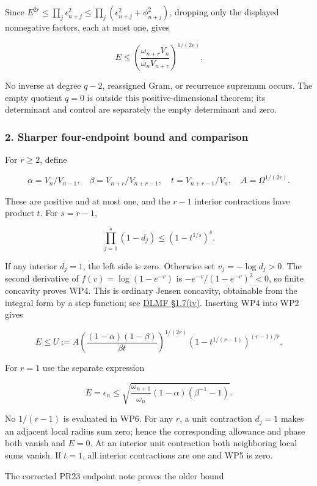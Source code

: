 Since \(E^{2r}\le\prod_j\epsilon_{n+j}^2\le\prod_j(\epsilon_{n+j}^2+\phi_{n+j}^2)\), dropping only the displayed nonnegative factors, each at most one, gives

\[
\boxed{E\le\left(\frac{\omega_{n+r}V_n}{\omega_nV_{n+r}}\right)^{1/(2r)}.} \tag{WP3}
\]

No inverse at degree \(q-2\), reassigned Gram, or recurrence supremum occurs. The empty quotient \(q=0\) is outside this positive-dimensional theorem; its determinant and control are separately the empty determinant and zero.

\subsubsection{2. Sharper four-endpoint bound and comparison}\label{endpoint-window_product_owner--sharper-four-endpoint-bound-and-comparison}

For \(r\ge2\), define

\[
\alpha=V_n/V_{n-1},\quad \beta=V_{n+r}/V_{n+r-1},\quad
t=V_{n+r-1}/V_n,\quad A=\Omega^{1/(2r)}.
\]

These are positive and at most one, and the \(r-1\) interior contractions have product \(t\). For \(s=r-1\),

\[
\prod_{j=1}^s(1-d_j)\le(1-t^{1/s})^s. \tag{WP4}
\]

If any interior \(d_j=1\), the left side is zero. Otherwise set \(v_j=-\log d_j>0\). The second derivative of \(f(v)=\log(1-e^{-v})\) is \(-e^{-v}/(1-e^{-v})^2<0\), so finite concavity proves WP4. This is ordinary Jensen concavity, obtainable from the integral form by a step function; see \href{https://dlmf.nist.gov/1.7.iv}{DLMF §1.7(iv)}. Inserting WP4 into WP2 gives

\[
\boxed{E\le U:=A
\left(\frac{(1-\alpha)(1-\beta)}{\beta t}\right)^{1/(2r)}
\left(1-t^{1/(r-1)}\right)^{(r-1)/r}.} \tag{WP5}
\]

For \(r=1\) use the separate expression

\[
E=\epsilon_n\le\sqrt{\frac{\omega_{n+1}}{\omega_n}
(1-\alpha)(\beta^{-1}-1)}. \tag{WP6}
\]

No \(1/(r-1)\) is evaluated in WP6. For any \(r\), a unit contraction \(d_j=1\) makes an adjacent local radius sum zero; hence the corresponding allowance and phase both vanish and \(E=0\). At an interior unit contraction both neighboring local sums vanish. If \(t=1\), all interior contractions are one and WP5 is zero.

The corrected PR23 endpoint note proves the older bound

